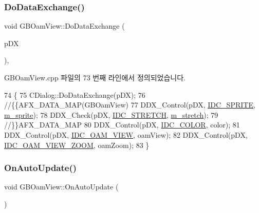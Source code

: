 \subsubsection{\texorpdfstring{Do\+Data\+Exchange()}{DoDataExchange()}}
{\footnotesize\ttfamily void G\+B\+Oam\+View\+::\+Do\+Data\+Exchange (\begin{DoxyParamCaption}\item[{C\+Data\+Exchange $\ast$}]{p\+DX }\end{DoxyParamCaption})\hspace{0.3cm}{\ttfamily [protected]}, {\ttfamily [virtual]}}



G\+B\+Oam\+View.\+cpp 파일의 73 번째 라인에서 정의되었습니다.


\begin{DoxyCode}
74 \{
75   CDialog::DoDataExchange(pDX);
76   \textcolor{comment}{//\{\{AFX\_DATA\_MAP(GBOamView)}
77   DDX\_Control(pDX, \mbox{\hyperlink{resource_8h_a39ea4aab0d21552e54f688ffae515f40}{IDC\_SPRITE}}, \mbox{\hyperlink{class_g_b_oam_view_a696d053b141cce3bf87fc4b85732159b}{m\_sprite}});
78   DDX\_Check(pDX, \mbox{\hyperlink{resource_8h_a639d2318d8892c6f42b323500aae50f0}{IDC\_STRETCH}}, \mbox{\hyperlink{class_g_b_oam_view_a3148ea0439a7fc0679298adbdb5d2a3e}{m\_stretch}});
79   \textcolor{comment}{//\}\}AFX\_DATA\_MAP}
80   DDX\_Control(pDX, \mbox{\hyperlink{resource_8h_a611975b03b6d7ce68b2de260b97086d0}{IDC\_COLOR}}, color);
81   DDX\_Control(pDX, \mbox{\hyperlink{resource_8h_a9b64c0912aa96e257bf909982c83e5ab}{IDC\_OAM\_VIEW}}, oamView);
82   DDX\_Control(pDX, \mbox{\hyperlink{resource_8h_a7e646a067717f74b563429c8b81c7df2}{IDC\_OAM\_VIEW\_ZOOM}}, oamZoom);
83 \}
\end{DoxyCode}
\mbox{\label{class_g_b_oam_view_a2c508aeb9089bfb1a21f88bd92c6753d}} 
\subsubsection{\texorpdfstring{On\+Auto\+Update()}{OnAutoUpdate()}}
{\footnotesize\ttfamily void G\+B\+Oam\+View\+::\+On\+Auto\+Update (\begin{DoxyParamCaption}{ }\end{DoxyParamCaption})\hspace{0.3cm}{\ttfamily [protected]}}



